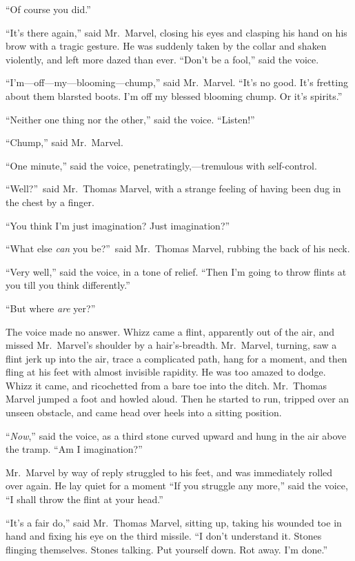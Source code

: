 “Of course you did.”

“It’s there again,” said Mr.\ Marvel, closing his eyes and clasping his hand on his brow with a tragic gesture. He was suddenly taken by the collar and shaken violently, and left more dazed than ever. “Don’t be a fool,” said the voice.

“I’m—off—my—blooming—chump,” said Mr.\ Marvel. “It’s no good. It’s fretting about them blarsted boots. I’m off my blessed blooming chump. Or it’s spirits.”

“Neither one thing nor the other,” said the voice. “Listen!”

“Chump,” said Mr.\ Marvel.

“One minute,” said the voice, penetratingly,—tremulous with self-control.

“Well?”\ said Mr.\ Thomas Marvel, with a strange feeling of having been dug in the chest by a finger.

“You think I’m just imagination? Just imagination?”

“What else \emph{can} you be?”\ said Mr.\ Thomas Marvel, rubbing the back of his neck.

“Very well,” said the voice, in a tone of relief. “Then I’m going to throw flints at you till you think differently.”

“But where \emph{are} yer?”

The voice made no answer. Whizz came a flint, apparently out of the air, and missed Mr.\ Marvel’s shoulder by a hair’s-breadth. Mr.\ Marvel, turning, saw a flint jerk up into the air, trace a complicated path, hang for a moment, and then fling at his feet with almost invisible rapidity. He was too amazed to dodge. Whizz it came, and ricochetted from a bare toe into the ditch. Mr.\ Thomas Marvel jumped a foot and howled aloud. Then he started to run, tripped over an unseen obstacle, and came head over heels into a sitting position.

“\emph{Now},” said the voice, as a third stone curved upward and hung in the air above the tramp. “Am I imagination?”

Mr.\ Marvel by way of reply struggled to his feet, and was immediately rolled over again. He lay quiet for a moment “If you struggle any more,” said the voice, “I shall throw the flint at your head.”

“It’s a fair do,” said Mr.\ Thomas Marvel, sitting up, taking his wounded toe in hand and fixing his eye on the third missile. “I don’t understand it. Stones flinging themselves. Stones talking. Put yourself down. Rot away. I’m done.”

